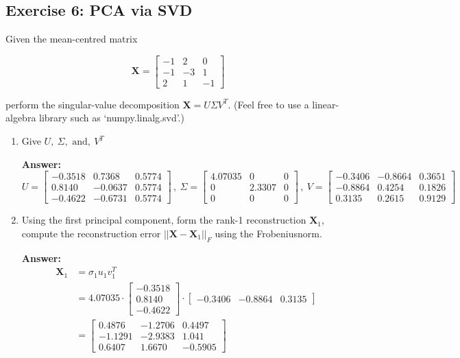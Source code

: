 \documentclass[11pt]{article}
\begin{document}
\subsection*{Exercise 6: PCA via SVD}

\noindent
Given the mean-centred matrix

\[
    \mathbf{X} = \begin{bmatrix}
        -1 & 2 & 0 \\
        -1 & -3 & 1 \\ 
        2 & 1 & -1
    \end{bmatrix}
\]

perform the singular-value decomposition \(\mathbf{X} = U \Sigma V^T\). (Feel free to use a linear-algebra library
such as `numpy.linalg.svd'.)
\begin{enumerate}[label=(\alph*)]
    \item Give \(U, \ \Sigma, \text{ and}, \ V^T\)

    \textbf{Answer:}
    {\small\[
    U = \begin{bmatrix}
        -0.3518 & 0.7368 & 0.5774 \\ 
        0.8140 & -0.0637 & 0.5774 \\
        -0.4622 & -0.6731 & 0.5774
    \end{bmatrix} \, , \ 
    \Sigma = \begin{bmatrix}
        4.07035 & 0 & 0 \\ 
        0 & 2.3307 & 0 \\
        0 & 0 & 0        
    \end{bmatrix} \, , \
    V = \begin{bmatrix}
        -0.3406 & -0.8664 & 0.3651 \\
        -0.8864 & 0.4254 & 0.1826 \\ 
        0.3135 & 0.2615 & 0.9129
    \end{bmatrix}
    \]}

    \item Using the first principal component, form the rank-1 reconstruction \(\mathbf{X}_1\), compute the reconstruction error \(||\mathbf{X} - \mathbf{X}_1||_F\) using the Frobeniusnorm.
    
    \textbf{Answer:} 
    \begin{align*}
        \mathbf{X}_1 &= \sigma_1 u_1 v^T_1 \\
        &= 4.07035 \cdot \begin{bmatrix} -0.3518 \\ 0.8140 \\ -0.4622 \end{bmatrix} \cdot \begin{bmatrix} -0.3406 & -0.8864 & 0.3135 \end{bmatrix} \\ 
        &= \begin{bmatrix}
           0.4876 & -1.2706 & 0.4497 \\ 
           -1.1291 & -2.9383 & 1.041 \\ 
           0.6407 & 1.6670 & -0.5905 
        \end{bmatrix}
    \end{align*}


\end{enumerate}
\end{document}

